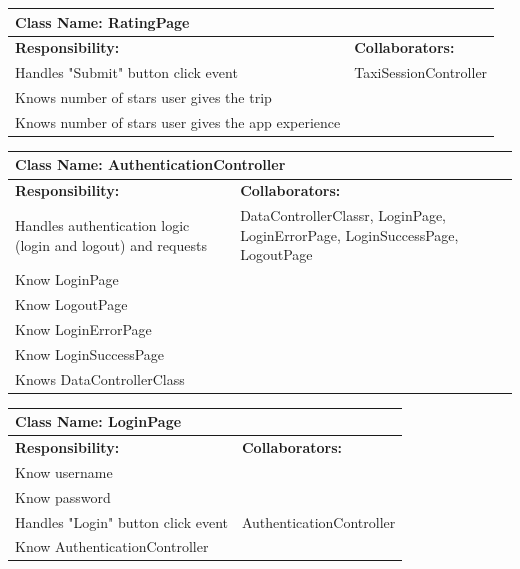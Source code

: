 \documentclass[]{article}
\begin{document}
	\begin{table}[H]
	\centering
	\begin{tabular}{|p{6cm}|p{6cm}|}
	\hline 
		\multicolumn{2}{|l|}{\textbf{Class Name: RatingPage}} \\
	\hline
	\textbf{Responsibility:} & \textbf{Collaborators:} \\
	\hline
	Handles "Submit" button click event  & TaxiSessionController \\ \hline
	Knows number of stars user gives the trip & \\ \hline
	Knows number of stars user gives the app experience & \\ \hline
	\end{tabular}
	\end{table}
	
	\begin{table}[H]
	\centering
	\begin{tabular}{|p{6cm}|p{6cm}|}
	\hline 
		\multicolumn{2}{|l|}{\textbf{Class Name: AuthenticationController}} \\
	\hline
	\textbf{Responsibility:} & \textbf{Collaborators:} \\
	\hline
	Handles authentication logic (login and logout) and requests & DataControllerClassr, LoginPage, LoginErrorPage, LoginSuccessPage, LogoutPage\\ \hline 
	Know LoginPage & \\ \hline 
	Know LogoutPage & \\ \hline 
	Know LoginErrorPage & \\ \hline
	Know LoginSuccessPage & \\ \hline
	Knows DataControllerClass& \\ \hline
	\end{tabular}
	\end{table}

	\begin{table}[H]
	\centering
	\begin{tabular}{|p{6cm}|p{6cm}|}
	\hline 
		\multicolumn{2}{|l|}{\textbf{Class Name: LoginPage}} \\
	\hline
	\textbf{Responsibility:} & \textbf{Collaborators:} \\
	\hline
	Know username & \\ \hline
	Know password & \\ \hline
	Handles "Login" button click event  & AuthenticationController\\ \hline
	Know AuthenticationController &\\ \hline
	\end{tabular}
	\end{table}
\end{document}
